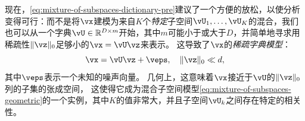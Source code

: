 \documentclass[../../book-main_zh.tex]{subfiles}
\begin{document}
现在，\eqref{eq:mixture-of-subspaces-dictionary-pre}建议了一个方便的放松，以使分析变得可行：而不是将$\vx$建模为来自$K$个\textit{特定}子空间$\vU_1, \dots, \vU_K$的混合，我们也可以从一个字典$\vU \in \R^{D \times m}$开始，其中$m$可能小于或大于$D$，并简单地寻求用稀疏性$\norm{\vz}_0$足够小的$\vx = \vU \vz$来表示。
这导致了$\vx$的\textit{稀疏字典模型}：
\begin{equation}\label{eq:mixture-of-subspaces-dictionary}
    \vx =  \vU \vz + \veps,
    \quad
    \norm{\vz}_0 \ll d,
\end{equation}
其中$\veps$表示一个未知的噪声向量。
几何上，这意味着$\vx$接近于$\vU$的$\norm{\vz}_0$列的子集的张成空间，
这使得它成为混合子空间模型\eqref{eq:mixture-of-subspaces-geometric}的一个实例，其中$K$的值非常大，并且子空间$\vU_k$之间存在特定的相关性。

\end{document}
